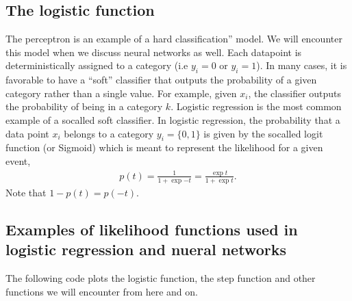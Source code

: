 \documentclass[letterpaper,10pt,english]{sphinxmanual}
\begin{document}
\subsection{The logistic function}
\label{\detokenize{chapter5:the-logistic-function}}
The perceptron is an example of a \textasciigrave{}\textasciigrave{}hard classification” model. We
will encounter this model when we discuss neural networks as
well. Each datapoint is deterministically assigned to a category (i.e
\(y_i=0\) or \(y_i=1\)). In many cases, it is favorable to have a “soft”
classifier that outputs the probability of a given category rather
than a single value. For example, given \(x_i\), the classifier
outputs the probability of being in a category \(k\).  Logistic regression
is the most common example of a so\sphinxhyphen{}called soft classifier. In logistic
regression, the probability that a data point \(x_i\)
belongs to a category \(y_i=\{0,1\}\) is given by the so\sphinxhyphen{}called logit function (or Sigmoid) which is meant to represent the likelihood for a given event,
\begin{equation*}
\begin{split}
p(t) = \frac{1}{1+\mathrm \exp{-t}}=\frac{\exp{t}}{1+\mathrm \exp{t}}.
\end{split}
\end{equation*}
Note that \(1-p(t)= p(-t)\).


\subsection{Examples of likelihood functions used in logistic regression and nueral networks}
\label{\detokenize{chapter5:examples-of-likelihood-functions-used-in-logistic-regression-and-nueral-networks}}
The following code plots the logistic function, the step function and other functions we will encounter from here and on.
\end{document}
